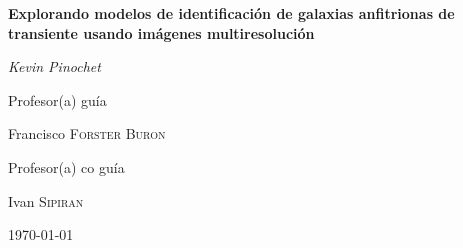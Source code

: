 \documentclass[../proposal.tex]{subfiles}
\begin{document}
\begin{titlepage}
    \centering
    \vfill
    {\huge\bfseries Explorando modelos de identificación de galaxias anfitrionas de transiente usando imágenes multiresolución\par}
    \vspace{1cm}
    {\Large\itshape Kevin Pinochet\par}
    \vfill
    Profesor(a) guía\par
    Francisco \textsc{Forster Buron}\par
    \vspace{1cm}
    Profesor(a) co guía\par
    Ivan \textsc{Sipiran}\par
    \par
    \vspace{1cm}
    \date{\today}
    \vfill
{\large \today\par}
\end{titlepage}
\end{document}

